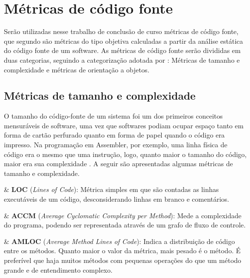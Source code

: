 
\section{Métricas de código fonte}

Serão utilizadas nesse trabalho de conclusão de curso métricas de código fonte, que segundo  são métricas do tipo objetiva calculadas a partir da análise estática do código fonte de um software. As métricas de código fonte serão divididas em duas categorias, seguindo a categorização adotada por : Métricas de tamanho e complexidade e métricas de orientação a objetos.

\subsection{Métricas de tamanho e complexidade}

O tamanho do código-fonte de um sistema foi um dos primeiros conceitos mensuráveis de software, uma vez que softwares podiam ocupar espaço tanto em forma de cartão perfurado quanto em forma de papel quando o código era impresso. Na programação em Assembler, por exemplo, uma linha física de código era o mesmo que uma instrução, logo, quanto maior o tamanho do código, maior era sua complexidade \cite{metricsandmodels}. A seguir são apresentadas algumas métricas de tamanho e complexidade.

\begin{easylist}[itemize]

	& \textbf{LOC} (\textit{Lines of Code}): Métrica simples em que são contadas as linhas executáveis de um código, desconsiderando linhas em branco e comentários.  \cite{metricsandmodels} 
		
	& \textbf{ACCM} (\textit{Average Cyclomatic Complexity per Method}): Mede a complexidade do programa, podendo ser representada através de um grafo de fluxo de controle. \cite{McCabe76}

	& \textbf{AMLOC} (\textit{Average Method Lines of Code}): Indica a distribuição de código entre os métodos. Quanto maior o valor da métrica, mais pesado é o método. É preferível que haja muitos métodos com pequenas operações do que um método grande e de entendimento complexo. \cite{Meirelles2013}
	
\end{easylist}

